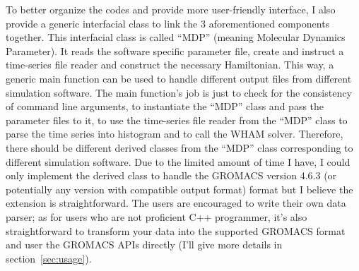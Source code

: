 To better organize the codes and provide more user-friendly interface, I also
provide a generic interfacial class to link the 3 aforementioned components
together. This interfacial class is called ``MDP'' (meaning Molecular Dynamics
Parameter). It reads the software specific parameter file, create and instruct
a time-series file reader and construct the necessary Hamiltonian. This way, a
generic main function can be used to handle different output files from
different simulation software. The main function's job is just to check for the
consistency of command line arguments, to instantiate the ``MDP'' class and
pass the parameter files to it, to use the time-series file reader from the
``MDP'' class to parse the time series into histogram and to call the WHAM
solver. Therefore, there should be different derived classes from the ``MDP''
class corresponding to different simulation software. Due to the limited amount
of time I have, I could only implement the derived class to handle the GROMACS
version 4.6.3 (or potentially any version with compatible output format) format
but I believe the extension is straightforward. The users are encouraged to
write their own data parser; as for users who are not proficient C++
programmer, it's also straightforward to transform your data into the supported
GROMACS format and user the GROMACS APIs directly (I'll give more details
in section~\ref{sec:usage}).
